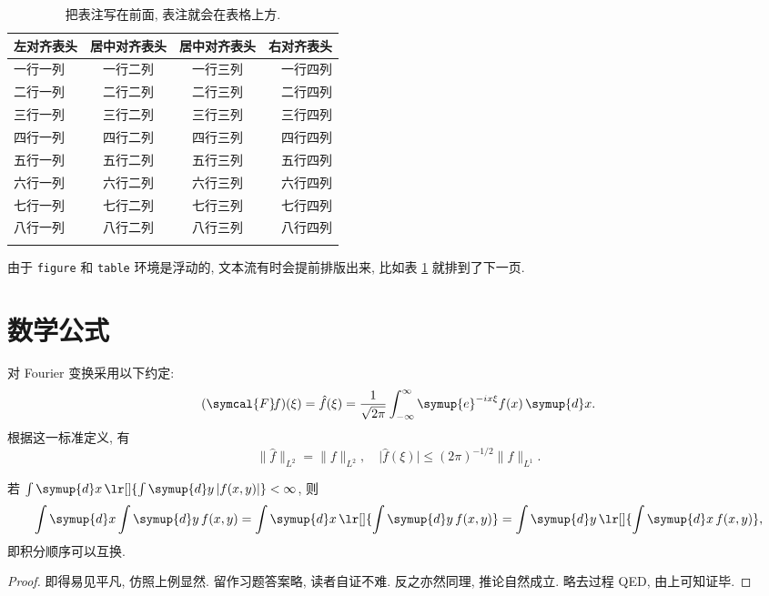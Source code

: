 \documentclass[draft,newenv,newcmd]{ncuthesis}
\begin{document}
\begin{table}[htb]
\centering
\caption{把表注写在前面, 表注就会在表格上方.}
\begin{tabular}{lccr}
  \thickhline
  左对齐表头 & 居中对齐表头 & 居中对齐表头 & 右对齐表头 \\
  \hline
  一行一列   & 一行二列     & 一行三列     & 一行四列 \\
  二行一列   & 二行二列     & 二行三列     & 二行四列 \\
  三行一列   & 三行二列     & 三行三列     & 三行四列 \\
  四行一列   & 四行二列     & 四行三列     & 四行四列 \\
  五行一列   & 五行二列     & 五行三列     & 五行四列 \\
  六行一列   & 六行二列     & 六行三列     & 六行四列 \\
  七行一列   & 七行二列     & 七行三列     & 七行四列 \\
  八行一列   & 八行二列     & 八行三列     & 八行四列 \\
  \thickhline
\end{tabular}
\label{tab:example-tab}
\end{table}

由于 \verb|figure| 和 \verb|table| 环境是浮动的, 文本流有时会提前排版出来, 
比如表 \ref{tab:example-tab} 就排到了下一页. 

\section{数学公式}
对 Fourier 变换采用以下约定:
\begin{equation}
  (\symcal{F}\!f)(\xi) = \hat f(\xi) = \frac{1}{\sqrt{2\pi}}
    \int_{-\infty}^{\infty}\symup{e}^{-ix\xi}f(x)\,\symup{d}x.
\end{equation}
根据这一标准定义, 有
\[
  \lVert\hat f\rVert_{L^2} = \lVert f\rVert_{L^2},\quad
  \lvert\hat f(\xi)\rvert \leq (2\pi)^{-1/2}\lVert f\rVert_{L^1}.
\]
\begin{theorem}[Fubini 定理]
若 $\int\symup{d}x\,\lr[]{\int\symup{d}y\,\lvert f(x,y)\rvert} < \infty$, 则
\begin{equation}
  \int\symup{d}x\int\symup{d}y\,f(x,y)
    = \int\symup{d}x\,\lr[]{\int\symup{d}y\,f(x,y)}
    = \int\symup{d}y\,\lr[]{\int\symup{d}x\,f(x,y)},
\end{equation}
即积分顺序可以互换.
\end{theorem}
\begin{proof}
即得易见平凡, 仿照上例显然. 留作习题答案略, 读者自证不难. 
反之亦然同理, 推论自然成立. 略去过程 QED, 由上可知证毕. \freeze
\end{proof}
\appendix
\end{document}
